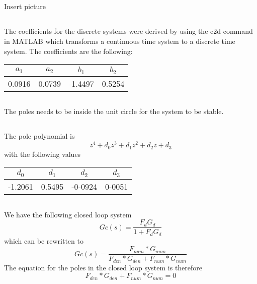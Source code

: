 \documentclass[12pt,a4paper]{article}
\begin{document}
\subsection{}%

\subsection{}%
Insert picture
\subsection{}%

The coefficients for the discrete systems were derived by using the c2d command in MATLAB which transforms a continuous time system to a discrete time system. The coefficients are the following:
\begin{center}
	\begin{tabular}{| c | c | c | c |}
	\hline
	$a_1$ & $a_2$ & $b_1$ & $b_2$ \\
	\hline
	0.0916 & 0.0739 & -1.4497 & 0.5254 \\
	\hline
	\end{tabular}
\end{center}

\subsection{}%
The poles needs to be inside the unit circle for the system to be stable.

\subsection{}%
The pole polynomial is
	\begin{equation}
		z^4+d_0z^3+d_1z^2+d_2z +d_3
	\end{equation}
	with the following values
\begin{center}
	\begin{tabular}{| c | c | c | c |}
	\hline
	$d_0$ & $d_1$ & $d_2$ & $d_3$ \\
	\hline
	-1.2061 & 0.5495 & -0-0924 & 0-0051 \\
	\hline
	\end{tabular}
\end{center}

\subsection{} %
We have the following closed loop system
\begin{equation}
	Gc(s) = \frac{F_dG_d}{1+F_dG_d}
\end{equation}
which can be rewritten to
\begin{equation}
	Gc(s) = \frac{F_{num}*G_{num}}{F_{den}*G_{den}+F_{num}*G_{num}}
\end{equation}
The equation for the poles in the closed loop system is therefore
\begin{equation}
	F_{den}*G_{den}+F_{num}*G_{num} = 0
\end{equation}
\end{document}
